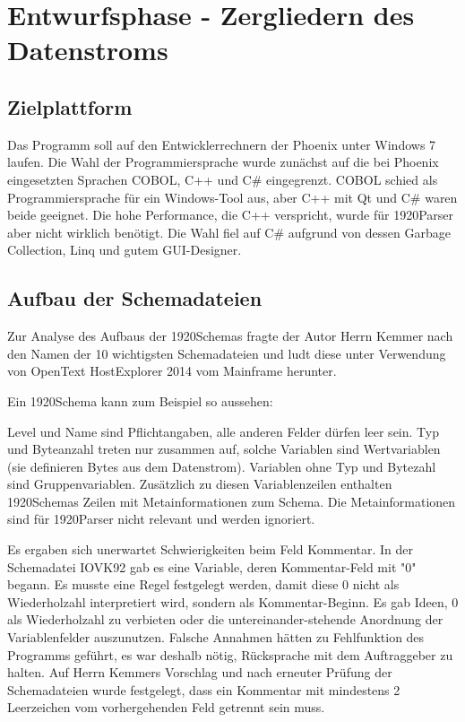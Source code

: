 \section{Entwurfsphase - Zergliedern des Datenstroms} 
\label{sec:Entwurfsphase}

\subsection{Zielplattform}
\label{sec:Zielplattform}
Das Programm soll auf den Entwicklerrechnern der Phoenix unter Windows 7 laufen. 
Die Wahl der Programmiersprache wurde zunächst auf die bei Phoenix eingesetzten Sprachen COBOL, C++ und C\# eingegrenzt. COBOL schied als Programmiersprache für ein Windows-Tool aus,  aber C++ mit Qt und C\# waren beide geeignet. Die hohe Performance, die C++ verspricht, wurde für 1920Parser aber nicht wirklich benötigt. Die Wahl fiel auf C\# aufgrund von dessen Garbage Collection, Linq und gutem GUI-Designer.

\subsection{Aufbau der Schemadateien}
\label{sec:AufbauSchemas}
Zur Analyse des Aufbaus der 1920Schemas fragte der Autor Herrn Kemmer nach den Namen der 10 wichtigsten Schemadateien und ludt diese unter Verwendung von OpenText HostExplorer 2014 vom Mainframe herunter.

Ein 1920Schema kann zum Beispiel so aussehen:



Level und Name sind Pflichtangaben, alle anderen Felder dürfen leer sein. Typ und Byteanzahl treten nur zusammen auf, solche Variablen sind Wertvariablen (sie definieren Bytes aus dem Datenstrom). Variablen ohne Typ und Bytezahl sind Gruppenvariablen.
Zusätzlich zu diesen Variablenzeilen enthalten 1920Schemas Zeilen mit Metainformationen zum Schema. Die Metainformationen sind für 1920Parser nicht relevant und werden ignoriert.

Es ergaben sich unerwartet Schwierigkeiten beim Feld Kommentar. In der Schemadatei IOVK92 gab es eine Variable, deren Kommentar-Feld mit "0" begann. Es musste eine Regel festgelegt werden, damit diese 0 nicht als Wiederholzahl interpretiert wird, sondern als Kommentar-Beginn. Es gab Ideen, 0 als Wiederholzahl zu verbieten oder die untereinander-stehende Anordnung der Variablenfelder auszunutzen. Falsche Annahmen hätten zu Fehlfunktion des Programms geführt, es war deshalb nötig, Rücksprache mit dem Auftraggeber zu halten. Auf Herrn Kemmers Vorschlag und nach erneuter Prüfung der Schemadateien wurde festgelegt, dass ein Kommentar mit mindestens 2 Leerzeichen vom vorhergehenden Feld getrennt sein muss.

